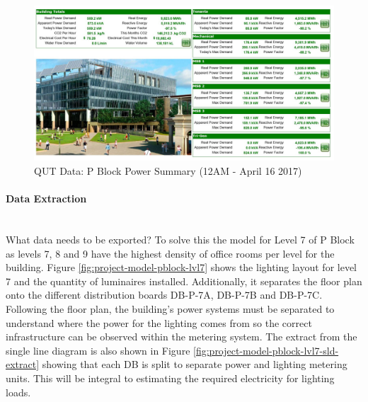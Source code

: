 \begin{figure}[H]
	\hfill\includegraphics[width = 150mm]{images/metering/pme/pme-p-block-summary-page}\hspace*{\fill}
	\caption{QUT Data: P Block Power Summary (12AM - April 16 2017)} 
	\label{fig:qut-pme-pblock-summary}
\end{figure} 

\paragraph{Data Extraction}
~~\\
What data needs to be exported? To solve this the model for Level 7 of P Block as levels 7, 8 and 9 have the highest density of office rooms per level for the building. Figure \ref{fig:project-model-pblock-lvl7} shows the lighting layout for level 7 and the quantity of luminaires installed. Additionally, it separates the floor plan onto the different distribution boards DB-P-7A, DB-P-7B and DB-P-7C. Following the floor plan, the building's power systems must be separated to understand where the power for the lighting comes from so the correct infrastructure can be observed within the metering system. The extract from the single line diagram is also shown in Figure \ref{fig:project-model-pblock-lvl7-sld-extract} showing that each DB is split to separate power and lighting metering units. This will be integral to estimating the required electricity for lighting loads.      

